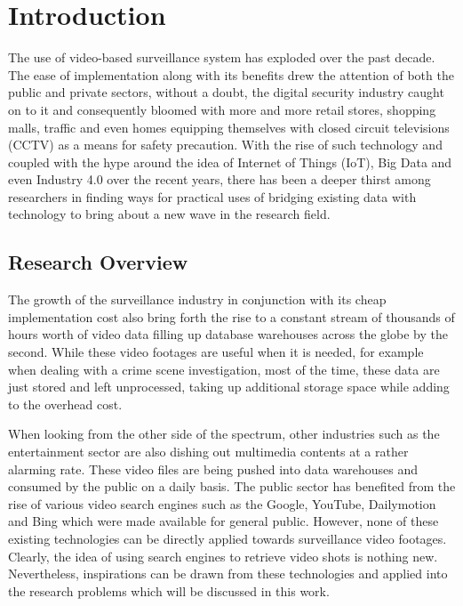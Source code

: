 \chapter{Introduction}
The use of video-based surveillance system has exploded over the past decade. The ease of implementation along with its benefits drew the attention of both the public and private sectors, without a doubt, the digital security industry caught on to it and consequently bloomed with more and more retail stores, shopping malls, traffic and even homes equipping themselves with closed circuit televisions (CCTV) as a means for safety precaution. With the rise of such technology and coupled with the hype around the idea of Internet of Things (IoT), Big Data and even Industry 4.0 over the recent years, there has been a deeper thirst among researchers in finding ways for practical uses of bridging existing data with technology to bring about a new wave in the research field.

\section{Research Overview}
\label{section:introduction}

The growth of the surveillance industry in conjunction with its cheap implementation cost also bring forth the rise to a constant stream of thousands of hours worth of video data filling up database warehouses across the globe by the second. While these video footages are useful when it is needed, for example when dealing with a crime scene investigation, most of the time, these data are just stored and left unprocessed, taking up additional storage space while adding to the overhead cost. 

When looking from the other side of the spectrum, other industries such as the entertainment sector are also dishing out multimedia contents at a rather alarming rate. These video files are being pushed into data warehouses and consumed by the public on a daily basis. The public sector has benefited from the rise of various video search engines such as the Google, YouTube, Dailymotion and Bing which were made available for general public. However, none of these existing technologies can be directly applied towards surveillance video footages. Clearly, the idea of using search engines to retrieve video shots is nothing new. Nevertheless, inspirations can be drawn from these technologies and applied into the research problems which will be discussed in this work. 

